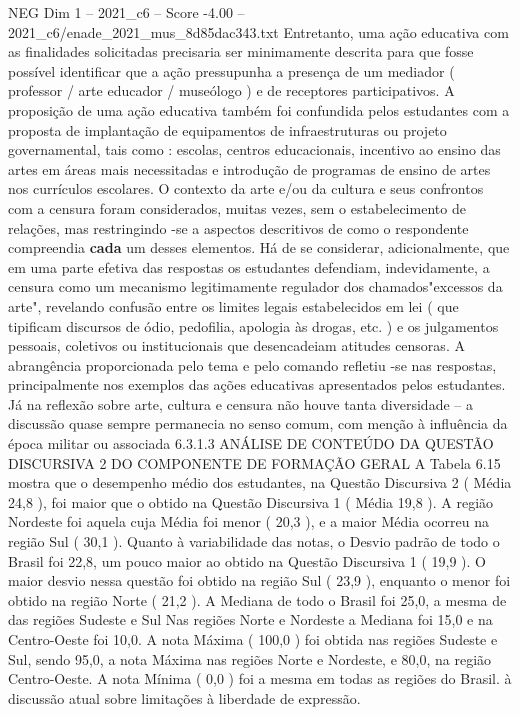 \begin{textsample}{NEG Dim 1 – 2021\_c6 – Score -4.00 – 2021\_c6/enade\_2021\_mus\_8d85dac343.txt}
Entretanto, uma ação educativa com as finalidades solicitadas precisaria ser minimamente descrita para que fosse possível identificar que a ação pressupunha a presença de um mediador ( professor / arte educador / museólogo ) e de receptores participativos.
A proposição de uma ação educativa também foi confundida pelos estudantes com a proposta de implantação de equipamentos de infraestruturas ou projeto governamental, tais como : escolas, centros educacionais, incentivo ao ensino das artes em áreas mais necessitadas e introdução de programas de ensino de artes nos currículos escolares.
O contexto da arte e/ou da cultura e seus confrontos com a censura foram considerados, muitas vezes, sem o estabelecimento de relações, mas restringindo -se a aspectos descritivos de como o respondente compreendia \textbf{cada} um desses elementos.
Há de se considerar, adicionalmente, que em uma parte efetiva das respostas os estudantes defendiam, indevidamente, a censura como um mecanismo legitimamente regulador dos chamados"excessos da arte", revelando confusão entre os limites legais estabelecidos em lei ( que tipificam discursos de ódio, pedofilia, apologia às drogas, etc. ) e os julgamentos pessoais, coletivos ou institucionais que desencadeiam atitudes censoras.
A abrangência proporcionada pelo tema e pelo comando refletiu -se nas respostas, principalmente nos exemplos das ações educativas apresentados pelos estudantes.
Já na reflexão sobre arte, cultura e censura não houve tanta diversidade – a discussão quase sempre permanecia no senso comum, com menção à influência da época militar ou associada 6.3.1.3 ANÁLISE DE CONTEÚDO DA QUESTÃO DISCURSIVA 2 DO COMPONENTE DE FORMAÇÃO GERAL A Tabela 6.15 mostra que o desempenho médio dos estudantes, na Questão Discursiva 2 ( Média 24,8 ), foi maior que o obtido na Questão Discursiva 1 ( Média 19,8 ).
A região Nordeste foi aquela cuja Média foi menor ( 20,3 ), e a maior Média ocorreu na região Sul ( 30,1 ).
Quanto à variabilidade das notas, o Desvio padrão de todo o Brasil foi 22,8, um pouco maior ao obtido na Questão Discursiva 1 ( 19,9 ).
O maior desvio nessa questão foi obtido na região Sul ( 23,9 ), enquanto o menor foi obtido na região Norte ( 21,2 ).
A Mediana de todo o Brasil foi 25,0, a mesma de das regiões Sudeste e Sul Nas regiões Norte e Nordeste a Mediana foi 15,0 e na Centro-Oeste foi 10,0.
A nota Máxima ( 100,0 ) foi obtida nas regiões Sudeste e Sul, sendo 95,0, a nota Máxima nas regiões Norte e Nordeste, e 80,0, na região Centro-Oeste.
A nota Mínima ( 0,0 ) foi a mesma em todas as regiões do Brasil. à discussão atual sobre limitações à liberdade de expressão.

\end{textsample}
